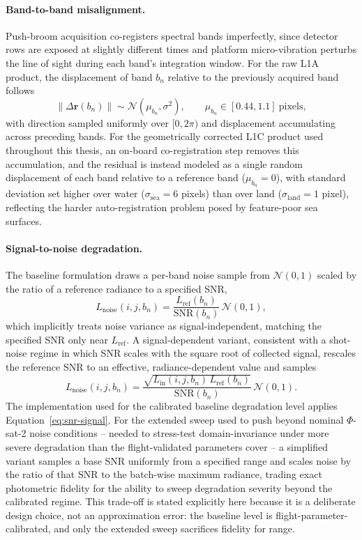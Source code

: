 \paragraph{Band-to-band misalignment.}
Push-broom acquisition co-registers spectral bands imperfectly, since detector rows are exposed at slightly different times and platform micro-vibration perturbs the line of sight during each band's integration window.
For the raw L1A product, the displacement of band $b_n$ relative to the previously acquired band follows
\begin{equation}
    \|\Delta \mathbf{r}(b_n)\| \sim \mathcal{N}(\mu_{b_n}, \sigma^2), \qquad \mu_{b_n} \in [0.44, 1.1]\ \text{pixels},
    \label{eq:misalign-l1a}
\end{equation}
with direction sampled uniformly over $[0, 2\pi)$ and displacement accumulating across preceding bands.
For the geometrically corrected L1C product used throughout this thesis, an on-board co-registration step removes this accumulation, and the residual is instead modeled as a single random displacement of each band relative to a reference band ($\mu_{b_n} = 0$), with standard deviation set higher over water ($\sigma_{\text{sea}} = 6$ pixels) than over land ($\sigma_{\text{land}} = 1$ pixel), reflecting the harder auto-registration problem posed by feature-poor sea surfaces.

\paragraph{Signal-to-noise degradation.} The baseline formulation draws a per-band noise sample from $\mathcal{N}(0,1)$ scaled by the ratio of a reference radiance to a specified SNR,
\begin{equation}
    L_{\text{noise}}(i,j,b_n) = \frac{L_{\text{ref}}(b_n)}{\text{SNR}(b_n)}\,\mathcal{N}(0,1), \label{eq:snr-const} \end{equation} which implicitly treats noise variance as signal-independent, matching the specified SNR only near $L_{\text{ref}}$.
A signal-dependent variant, consistent with a shot-noise regime in which SNR scales with the square root of collected signal, rescales the reference SNR to an effective, radiance-dependent value and samples
\begin{equation}
    L_{\text{noise}}(i,j,b_n) = \frac{\sqrt{L_{\text{in}}(i,j,b_n)\,L_{\text{ref}}(b_n)}}{\text{SNR}(b_n)}\,\mathcal{N}(0,1).
    \label{eq:snr-signal}
\end{equation}
The implementation used for the calibrated baseline degradation level applies Equation~\eqref{eq:snr-signal}.
For the extended sweep used to push beyond nominal $\Phi$-sat-2 noise conditions -- needed to stress-test domain-invariance under more severe degradation than the flight-validated parameters cover -- a simplified variant samples a base SNR uniformly from a specified range and scales noise by the ratio of that SNR to the batch-wise maximum radiance, trading exact photometric fidelity for the ability to sweep degradation severity beyond the calibrated regime.
This trade-off is stated explicitly here because it is a deliberate design choice, not an approximation error: the baseline level is flight-parameter-calibrated, and only the extended sweep sacrifices fidelity for range.


